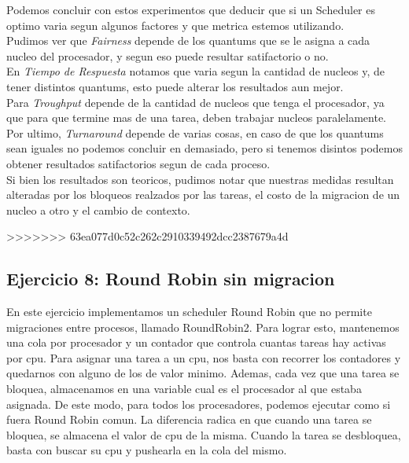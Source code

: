 \vspace{0,5 cm}
Podemos concluir con estos experimentos que deducir que si un Scheduler es optimo varia segun algunos factores y que metrica estemos utilizando.\\
Pudimos ver que \textit{Fairness} depende de los quantums que se le asigna a cada nucleo del procesador, y segun eso puede resultar satifactorio o no.\\
En \textit{Tiempo de Respuesta} notamos que varia segun la cantidad de nucleos y, de tener distintos quantums, esto puede alterar los resultados aun mejor.\\
Para \textit{Troughput} depende de la cantidad de nucleos que tenga el procesador, ya que para que termine mas de una tarea, deben trabajar nucleos paralelamente.\\
Por ultimo, \textit{Turnaround} depende de varias cosas, en caso de que los quantums sean iguales no podemos concluir en demasiado, pero si tenemos disintos podemos obtener resultados satifactorios segun de cada proceso.\\
Si bien los resultados son teoricos, pudimos notar que nuestras medidas resultan alteradas por los bloqueos realzados por las tareas, el costo de la migracion de un nucleo a otro y el cambio de contexto.



>>>>>>> 63ea077d0c52c262c2910339492dcc2387679a4d
\subsection{Ejercicio 8: Round Robin sin migracion}

En este ejercicio implementamos un scheduler Round Robin  que no permite migraciones entre procesos, llamado RoundRobin2. Para lograr esto, mantenemos una
cola por procesador 
y un contador que controla cuantas tareas hay activas por cpu. Para asignar una tarea a un cpu, nos basta con recorrer los contadores 
y quedarnos con alguno
de los de valor minimo. Ademas, cada vez que una tarea se bloquea, almacenamos en una variable cual
es el procesador al que estaba asignada. De este modo, para todos los procesadores, podemos ejecutar como si fuera Round Robin comun. La diferencia
radica en que cuando una tarea se bloquea, se almacena el valor de cpu de la misma. Cuando la tarea se desbloquea, basta con buscar su
cpu y pushearla en la cola del mismo.

